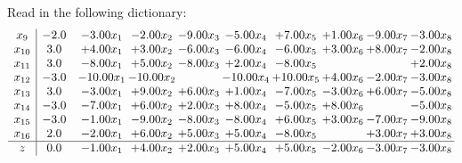 \documentclass[9pt]{article}
\begin{document}
Read in the following dictionary:
\[\begin{array}{c| c c@{\hskip 2pt} c@{\hskip 2pt} c@{\hskip 2pt} c@{\hskip 2pt} c@{\hskip 2pt} c@{\hskip 2pt} c@{\hskip 2pt} c@{\hskip 2pt} }
 x_{9}   &  -2.0 & -3.00 x_{1} & -2.00 x_{2} & -9.00 x_{3} & -5.00 x_{4} & +  7.00 x_{5} & +  1.00 x_{6} & -9.00 x_{7} & -3.00 x_{8}\\
 x_{10}   &  3.0 & +  4.00 x_{1} & +  3.00 x_{2} & -6.00 x_{3} & -6.00 x_{4} & -6.00 x_{5} & +  3.00 x_{6} & +  8.00 x_{7} & -2.00 x_{8}\\
 x_{11}   &  3.0 & -8.00 x_{1} & +  5.00 x_{2} & -8.00 x_{3} & +  2.00 x_{4} & -8.00 x_{5} &    &   & +  2.00 x_{8}\\
 x_{12}   &  -3.0 & -10.00 x_{1} & -10.00 x_{2} &   & -10.00 x_{4} & + 10.00 x_{5} & +  4.00 x_{6} & -2.00 x_{7} & -3.00 x_{8}\\
 x_{13}   &  3.0 & -3.00 x_{1} & +  9.00 x_{2} & +  6.00 x_{3} & +  1.00 x_{4} & -7.00 x_{5} & -3.00 x_{6} & +  6.00 x_{7} & -5.00 x_{8}\\
 x_{14}   &  -3.0 & -7.00 x_{1} & +  6.00 x_{2} & +  2.00 x_{3} & +  8.00 x_{4} & -5.00 x_{5} & +  8.00 x_{6} &   & -5.00 x_{8}\\
 x_{15}   &  -3.0 & -1.00 x_{1} & -9.00 x_{2} & -8.00 x_{3} & -8.00 x_{4} & +  6.00 x_{5} & +  3.00 x_{6} & -7.00 x_{7} & -9.00 x_{8}\\
 x_{16}   &  2.0 & -2.00 x_{1} & +  6.00 x_{2} & +  5.00 x_{3} & +  5.00 x_{4} & -8.00 x_{5} &   & +  3.00 x_{7} & +  3.00 x_{8}\\
\hline
z    &  0.0 & -1.00 x_{1} & +  4.00 x_{2} & +  2.00 x_{3} & +  5.00 x_{4} & +  5.00 x_{5} & -2.00 x_{6} & -3.00 x_{7} & -3.00 x_{8}\\
\end{array}\]
\end{document}
